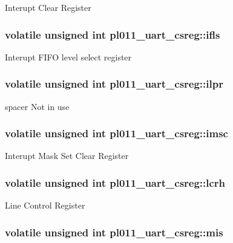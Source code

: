 Interupt Clear Register \hypertarget{structpl011__uart__csreg_a09d7f2bf1e7d0f792d9c1d679b09b34c}{
\subsubsection[{ifls}]{\setlength{\rightskip}{0pt plus 5cm}volatile unsigned int pl011\-\_\-uart\-\_\-csreg\-::ifls}}\label{structpl011__uart__csreg_a09d7f2bf1e7d0f792d9c1d679b09b34c}
Interupt F\-I\-F\-O level select register \hypertarget{structpl011__uart__csreg_a1f5d2e9afca91989656f0b6213fbb822}{
\subsubsection[{ilpr}]{\setlength{\rightskip}{0pt plus 5cm}volatile unsigned int pl011\-\_\-uart\-\_\-csreg\-::ilpr}}\label{structpl011__uart__csreg_a1f5d2e9afca91989656f0b6213fbb822}
spacer Not in use \hypertarget{structpl011__uart__csreg_a913643e822176d913092cb4d4c3be374}{
\subsubsection[{imsc}]{\setlength{\rightskip}{0pt plus 5cm}volatile unsigned int pl011\-\_\-uart\-\_\-csreg\-::imsc}}\label{structpl011__uart__csreg_a913643e822176d913092cb4d4c3be374}
Interupt Mask Set Clear Register \hypertarget{structpl011__uart__csreg_aadc71df89adc006df0c6c4a34cf9f01e}{
\subsubsection[{lcrh}]{\setlength{\rightskip}{0pt plus 5cm}volatile unsigned int pl011\-\_\-uart\-\_\-csreg\-::lcrh}}\label{structpl011__uart__csreg_aadc71df89adc006df0c6c4a34cf9f01e}
Line Control Register \hypertarget{structpl011__uart__csreg_aff917744b9eaab68caead0b3eda10b4d}{
\subsubsection[{mis}]{\setlength{\rightskip}{0pt plus 5cm}volatile unsigned int pl011\-\_\-uart\-\_\-csreg\-::mis}}\label{structpl011__uart__csreg_aff917744b9eaab68caead0b3eda10b4d}
